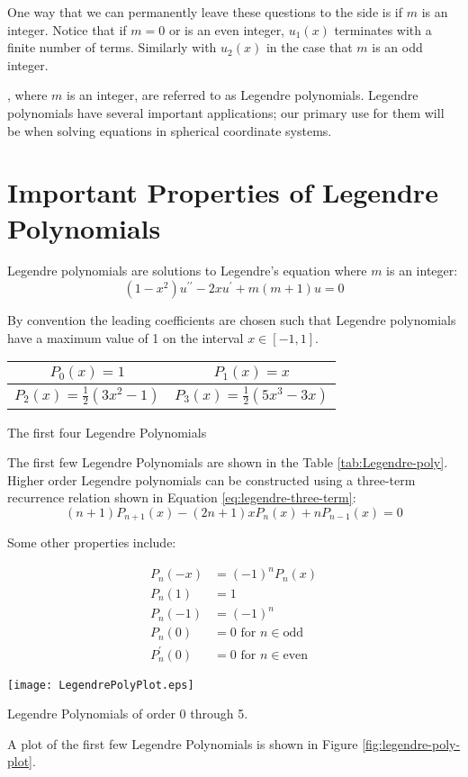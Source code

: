 One way that we can permanently leave these questions to the side is if $m$ is an integer.  Notice that if $m=0$ or is an even integer, $u_1(x)$ terminates with a finite number of terms. Similarly with $u_2(x)$ in the case that $m$ is an odd integer. 

, where $m$ is an integer, are referred to as Legendre polynomials.  Legendre polynomials have several important applications; our primary use for them will be when solving equations in spherical coordinate systems.

\section{Important Properties of Legendre Polynomials}
Legendre polynomials are solutions to Legendre's equation where $m$ is an integer:
\begin{equation*}
\left(1-x^2 \right)u^{\prime \prime} - 2xu^{\prime} + m(m+1)u = 0
\end{equation*}

By convention the leading coefficients are chosen such that Legendre polynomials have a maximum value of 1 on the interval $x\in[-1,1]$.  

\begin{margintable}
\begin{tabular}{c | c}
$P_0(x) = 1$ & $P_1(x) = x$ \\\hline
$P_2(x) = \frac{1}{2}(3x^2-1)$ & $P_3(x) = \frac{1}{2}(5x^3-3x)$ \\
\end{tabular}
\caption{The first four Legendre Polynomials}
\label{tab:Legendre-poly}
\end{margintable}
The first few Legendre Polynomials are shown in the Table \ref{tab:Legendre-poly}. Higher order Legendre polynomials can be constructed using a three-term recurrence relation shown in Equation \ref{eq:legendre-three-term}:
\begin{equation}
(n+1)P_{n+1}(x) - (2n+1)xP_n(x) + nP_{n-1}(x) = 0
\label{eq:legendre-three-term}
\end{equation}

\vspace{4.0cm}

Some other properties include:

\begin{align*}
P_n(-x) &= (-1)^nP_n(x) \\
P_n(1) &= 1 \\
P_n(-1) &= (-1)^n \\
P_n(0) &= 0 \text{ for } n\in{\text{odd}} \\
P_n^{\prime}(0) &=0 \text{ for } n\in{\text{even}}
\end{align*}
\begin{marginfigure}
\texttt{[image: LegendrePolyPlot.eps]}
\caption{Legendre Polynomials of order 0 through 5.}
\label{fig:legendre-poly-plot}
\end{marginfigure}
A plot of the first few Legendre Polynomials is shown in Figure \ref{fig:legendre-poly-plot}.


